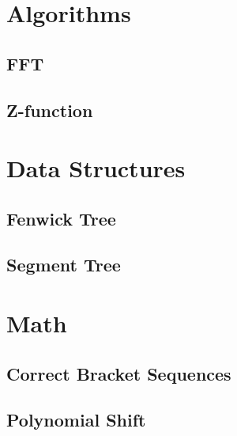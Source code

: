 \documentclass[12pt]{article}
\begin{document}
%
% 
%
% 

\section{Algorithms}

\subsection{FFT}


\subsection{Z-function}



\section{Data Structures}

\subsection{Fenwick Tree}


\subsection{Segment Tree}



\section{Math}

\subsection{Correct Bracket Sequences}


\subsection{Polynomial Shift}

\end{document}
